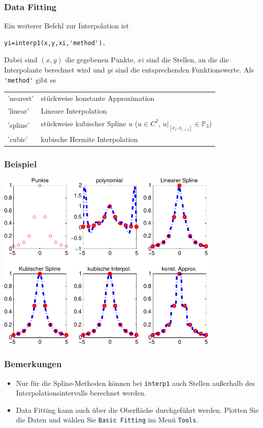 %
%
\begin{frame}[fragile]\frametitle{Data Fitting}
Ein weiterer Befehl  zur Interpolation ist
\begin{lstlisting}
yi=interp1(x,y,xi,'method').
\end{lstlisting}
Dabei sind $(x,y)$ die gegebenen Punkte, $xi$ sind die Stellen, an die
die Interpolante berechnet wird und $yi$ sind die entsprechenden
Funktionswerte. 
Als \lstinline!'method'! gibt es\\

{\scriptsize
\begin{tabular}{ll}
'nearest' &  stückweise konstante Approximation \\
'linear'  & Lineare Interpolation \\ 
'spline' & stückweise kubischer Spline $u$ ($u \in C^2$,
$u|_{[x_i,x_{i+1}]} \in \mathbb{P}_3$) \\
'cubic' & kubische Hermite Interpolation\\ 
\end{tabular}
}
\end{frame}
%
%
\begin{frame}[fragile]\frametitle{Beispiel}
\hfil\includegraphics[width=0.8\textwidth]{./figures/data_fitting}\hfil
\end{frame}
%
%
\begin{frame}[fragile]\frametitle{Bemerkungen}
\begin{itemize}
\item  Nur für die Spline-Methoden können   bei \lstinline!interp1!  auch
  Stellen außerhalb des
  Interpolationsintervalls berechnet werden.
\item Data Fitting kann auch über die Oberfläche durchgeführt werden.
 Plotten Sie die Daten und wählen Sie \lstinline!Basic Fitting! im Men\"u
 \lstinline!Tools!. 
\end{itemize}
\end{frame}

